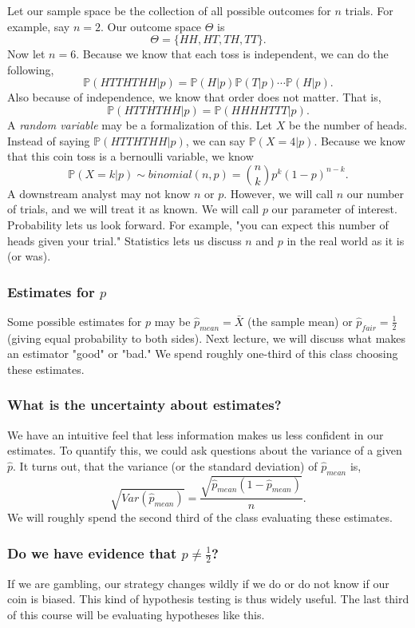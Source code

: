 \documentclass[titlepage, 12pt, leqno]{article}
\begin{document}
Let our sample space be the collection of all possible outcomes for $n$ trials.
For example, say $n=2$. Our outcome space $\Theta$ is
\[
    \Theta = \{HH, HT, TH, TT\}.
\]
Now let $n=6$. Because we know that each toss is independent, we can do the
following,
\[
\mathbb{P}(HTTHTHH|p) = \mathbb{P}(H|p)\mathbb{P}(T|p) \cdots \mathbb{P}(H|p).
\]
Also because of independence, we know that order does not matter. That is,
\[
\mathbb{P}(HTTHTHH|p) = \mathbb{P}(HHHHTTT|p).
\]
A \textit{random variable} may be a formalization of this. Let $X$ be the number
of heads. Instead of saying $\mathbb{P}(HTTHTHH|p)$, we can say 
 $\mathbb{P}(X=4|p)$. Because we know that this coin toss is a bernoulli
 variable, we know
 \[
 \mathbb{P}(X=k|p) \sim binomial(n,p) = \binom{n}{k}p^{k}(1-p)^{n-k}.
 \]
A downstream analyst may not know $n$ or $p$. However, we will call $n$ our
number of trials, and we will treat it as known. We will call $p$ our parameter
of interest. Probability lets us look forward. For example, "you can expect this
number of heads given your trial." Statistics lets us discuss $n$ and $p$ in the
real world as it is (or was).

\subsubsection{Estimates for $p$}
Some possible estimates for $p$ may be $\hat p_{mean}=\bar X$ (the sample mean)
or $\hat p_{fair}=\frac{1}{2}$ (giving equal probability to both sides). Next
lecture, we will discuss what makes an estimator "good" or "bad." We spend 
roughly one-third of this class choosing these estimates.

\subsubsection{What is the uncertainty about estimates?}
We have an intuitive feel that less information makes us less confident in our
estimates. To quantify this, we could ask questions about the variance of
a given $\hat p$. It turns out, that the variance (or the standard deviation)
of $\hat p_{mean}$ is,
\[
\sqrt{Var(\hat p_{mean})} = \frac{\sqrt{\hat p_{mean}(1-\hat p_{mean})}}{n}.
\]
We will roughly spend the second third of the class evaluating these estimates.

\subsubsection{Do we have evidence that $p \ne \frac{1}{2}$?}
If we are gambling, our strategy changes wildly if we do or do not know if our
coin is biased. This kind of hypothesis testing is thus widely useful. The 
last third of this course will be evaluating hypotheses like this.
\end{document}
